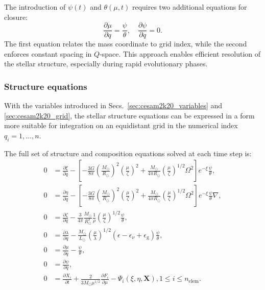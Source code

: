 \documentclass[12pt,a4paper]{article}
\newcommand{\mr}{\mathrm}
\newcommand{\pfird}[2][]{\frac{\partial#1}{\partial#2}}
\newcommand{\bvec}[1]{\boldsymbol{#1}}
\begin{document}
The introduction of $\psi(t)$ and $\theta(\mu, t)$ requires two additional equations for closure:
\begin{equation}
  \pfird[\mu]{q} = \frac{\psi}{\theta},\quad \pfird[\psi]{q} = 0.
\end{equation}
The first equation relates the mass coordinate to grid index, while the second enforces constant spacing in $Q$-space. This approach enables efficient resolution of the stellar structure, especially during rapid evolutionary phases.

\subsubsection{Structure equations}
\label{sec:cesam2k20_struct_eq}

With the variables introduced in Secs.~\ref{sec:cesam2k20_variables} and \ref{sec:cesam2k20_grid}, the stellar structure equations can be expressed in a form more suitable for integration on an equidistant grid in the numerical index $q_i = 1, \ldots, n$. 

The full set of structure and composition equations solved at each time step is:
\begin{subequations} \label{eq:cesam2k20_struct_eq}
  \begin{align}
    0 &= \pfird[\xi]{q} - \left[-\frac{3G}{8\pi}\left(\frac{M_\odot}{R_\odot}\right)^2\left(\frac{\mu}{\zeta}\right)^2 + \frac{M_\odot}{4\pi R_\odot}\left(\frac{\mu}{\zeta}\right)^{1/2} \Omega^2\right]e^{-\xi}\frac{\psi}{\theta}, \label{eq:cesam_struct1}\\
    0 &= \pfird[\eta]{q} - \left[-\frac{3G}{8\pi}\left(\frac{M_\odot}{R_\odot}\right)^2\left(\frac{\mu}{\zeta}\right)^2 + \frac{M_\odot}{4\pi R_\odot}\left(\frac{\mu}{\zeta}\right)^{1/2} \Omega^2\right]e^{-\xi}\frac{\psi}{\theta}\nabla, \label{eq:cesam_struct2}\\
    0 &= \pfird[\zeta]{q} - \frac{3}{4\pi}\frac{M_\odot}{R_\odot^3}\frac{1}{\rho}\left(\frac{\mu}{\zeta}\right)^{1/2}\frac{\psi}{\theta}, \label{eq:cesam_struct3}\\
    0 &= \pfird[\lambda]{q} - \frac{M_\odot}{L_\odot}\left(\frac{\mu}{\lambda}\right)^{1/2}(\epsilon  - \epsilon_\nu + \epsilon_\mr{g})\frac{\psi}{\theta}, \label{eq:cesam_struct4}\\
    0 &= \pfird[\mu]{q} - \frac{\psi}{\theta}, \label{eq:cesam_struct5}\\
    0 &= \pfird[\psi]{q}, \label{eq:cesam_struct6}\\
    0 &= \pfird[X_i]{t} + \frac{2}{3 M_\odot\mu^{1/2}}\pfird[F_i]{\mu} - \Psi_i(\xi, \eta, \bvec{X}), 1\leq i \leq n_\mr{elem}. \label{eq:cesam_struct7}
  \end{align}
\end{subequations}
\end{document}
